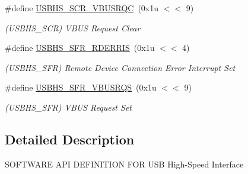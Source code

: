 \begin{DoxyCompactItemize}
\mbox{\label{group__SAMS70__USBHS_gad1e871610733843b30fb93043b28f9a2}} 
\#define \mbox{\hyperlink{group__SAMS70__USBHS_gad1e871610733843b30fb93043b28f9a2}{U\+S\+B\+H\+S\+\_\+\+S\+C\+R\+\_\+\+V\+B\+U\+S\+R\+QC}}~(0x1u $<$$<$ 9)
\begin{DoxyCompactList}\small\item\em (U\+S\+B\+H\+S\+\_\+\+S\+CR) V\+B\+US Request Clear \end{DoxyCompactList}\item 
\mbox{\label{group__SAMS70__USBHS_ga76b0735f9ffeb525f9723d4a1796aae0}} 
\#define \mbox{\hyperlink{group__SAMS70__USBHS_ga76b0735f9ffeb525f9723d4a1796aae0}{U\+S\+B\+H\+S\+\_\+\+S\+F\+R\+\_\+\+R\+D\+E\+R\+R\+IS}}~(0x1u $<$$<$ 4)
\begin{DoxyCompactList}\small\item\em (U\+S\+B\+H\+S\+\_\+\+S\+FR) Remote Device Connection Error Interrupt Set \end{DoxyCompactList}\item 
\mbox{\label{group__SAMS70__USBHS_ga1a1d4d07e12a2208954896e8ffe64c81}} 
\#define \mbox{\hyperlink{group__SAMS70__USBHS_ga1a1d4d07e12a2208954896e8ffe64c81}{U\+S\+B\+H\+S\+\_\+\+S\+F\+R\+\_\+\+V\+B\+U\+S\+R\+QS}}~(0x1u $<$$<$ 9)
\begin{DoxyCompactList}\small\item\em (U\+S\+B\+H\+S\+\_\+\+S\+FR) V\+B\+US Request Set \end{DoxyCompactList}\end{DoxyCompactItemize}


\subsection{Detailed Description}
S\+O\+F\+T\+W\+A\+RE A\+PI D\+E\+F\+I\+N\+I\+T\+I\+ON F\+OR U\+SB High-\/\+Speed Interface 